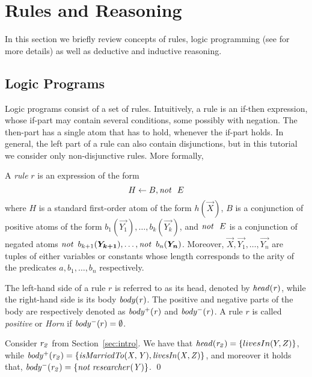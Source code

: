 \section{Rules and Reasoning}
\label{sec:reasoning}
In this section we briefly review concepts of rules, logic programming (see \cite{DBLP:conf/rweb/EiterIK09} for more details) as well as %
deductive and inductive reasoning.

\subsection{Logic Programs} Logic programs consist of a set of rules. Intuitively, a rule is an if-then expression, whose if-part may contain several conditions, some possibly with
negation. The then-part has a single atom that has to hold, whenever the if-part holds. In general, the left part of a rule can also contain disjunctions, but in this tutorial we consider only non-disjunctive rules. More formally,


\begin{definition}[Rule] A \emph{rule} $r$ is an expression of the form
\begin{equation}
H\leftarrow B, \mathit{not}~ \ E
\end{equation}
where $H$ is a standard first-order atom of the form $h(\vec{X})$, $B$ is a conjunction of positive atoms of the form $b_1(\vec{Y_1}),\dotsc,b_k(\vec{Y_k})$, and $\mathit{not}~ \ E$ %
 is a conjunction of negated atoms $\naf\, b_{k+1}(\vec{Y_{k+1}}),\dotsc,\naf\, b_n(\vec{Y_{n}})$. Moreover,  $\vec{X},\vec{Y_1},\ldots,\vec{Y_{n}}$ are tuples of either variables or constants whose length corresponds to the arity of the predicates $a,b_1,\ldots,b_n$ respectively.
\end{definition}

The left-hand side of a rule $r$ is referred to as its head, denoted by $\mathit{head(r)}$, while the right-hand side is its body $\mathit{body(r)}$. The positive and negative parts of the body are respectively denoted as $\mathit{body^+(r)}$ and $\mathit{body^-(r)}$. A rule $r$ is called \emph{positive} or
\emph{Horn} if $\mathit{body^-}(r)=\emptyset$.

\begin{example}
Consider $\mathit{r_2}$ from Section~\ref{sec:intro}. We have that $\mathit{head(r_2)}=\{livesIn(Y,Z)\}$, while $\mathit{body^+(r_2)=\{isMarriedTo(X,Y), livesIn(X,Z)\}}$, and moreover it holds that, $\mathit{body^-(r_2)=\{not\;researcher(Y)\}}$. \qed
\end{example}




